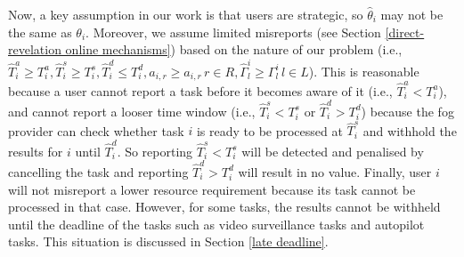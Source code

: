 \documentclass[11pt]{phdthesis}
\begin{document}

Now, a key assumption in our work is that users are strategic, so $\hat{\theta}_i$ may not be the same as $ \theta_i $. Moreover, we assume limited misreports (see Section \ref{direct-revelation online mechanisms}) based on the nature of our problem (i.e., $\hat{T}_i^a \geq T_i^a, \hat{T}_i^s \geq T_i^s, \hat{T}_i^d \leq T_i^d, \hat{a}_{i,r} \geq a_{i,r} \, r\in R, \hat{\Gamma}_l^i \geq \Gamma_l^i  \, l \in L $). This is reasonable because a user cannot report a task before it becomes aware of it (i.e., $ \hat{T}_i^a < T_i^a $), and cannot report a looser time window (i.e., $\hat{T}_i^s < T_i^s$ or $\hat{T}_i^d > T_i^d$) because the fog provider can check whether task $ i $ is ready to be processed at $ \hat{T}_i^s $ and withhold the results for $ i $ until $ \hat{T}_i^d $. So reporting $\hat{T}_i^s < T_i^s$ will be detected and penalised by cancelling the task and reporting $\hat{T}_i^d > T_i^d$ will result in no value. 
Finally, user $ i $ will not misreport a lower resource requirement because its task cannot be processed in that case. However, for some tasks, the results cannot be withheld until the deadline of the tasks such as video surveillance tasks and autopilot tasks. This situation is discussed in Section \ref{late deadline}.
\end{document}
